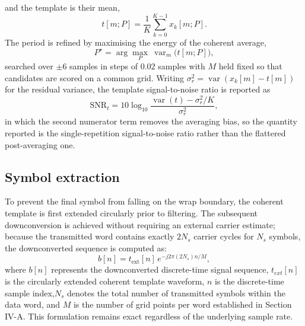 \documentclass{ieeeaccess}
\begin{document}
and the template is their mean,
\begin{equation}
t[m;P] = \frac{1}{K}\sum_{k=0}^{K-1} x_k[m;P].
\label{eq:template}
\end{equation}
The period is refined by maximising the energy of the coherent average,
\begin{equation}
P^{\star} = \arg\max_{P} \ \operatorname{var}_m\big(t[m; P]\big),
\label{eq:period}
\end{equation}
searched over $\pm 6$ samples in steps of $0.02$ samples with $M$ held fixed so
that candidates are scored on a common grid. Writing
$\sigma_r^2 = \operatorname{var}(x_k[m] - t[m])$ for the residual variance, the
template signal-to-noise ratio is reported as
\begin{equation}
\mathrm{SNR}_t = 10\log_{10}
\frac{\operatorname{var}(t) - \sigma_r^2/K}{\sigma_r^2},
\label{eq:tsnr}
\end{equation}
in which the second numerator term removes the averaging bias, so the quantity
reported is the single-repetition signal-to-noise ratio rather than the
flattered post-averaging one.

\subsection{Symbol extraction}
To prevent the final symbol from falling on the wrap boundary, the coherent template is first extended circularly prior to filtering. The subsequent downconversion is achieved without requiring an external carrier estimate; because the transmitted word contains exactly $2N_s$ carrier cycles for $N_s$ symbols, the downconverted sequence is computed as:
\begin{equation}
b[n] = t_{\mathrm{ext}}[n] \, e^{-j 2\pi (2N_s) n / M},
\label{eq:downconv}
\end{equation}
where $b[n]$ represents the downconverted discrete-time signal sequence, $t_{ext}[n]$ is the circularly extended coherent template waveform, $n$ is the discrete-time sample index,$N_s$ denotes the total number of transmitted symbols within the data word, and $M$ is the number of grid points per word established in Section IV-A. This formulation remains exact regardless of the underlying sample rate. 
\end{document}
